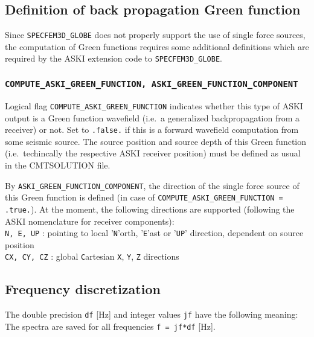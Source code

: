 \documentclass[12pt,a4paper]{article}
\newcommand{\lcode}[1]{\nolinkurl{#1}}
\newcommand{\ASKI}{ {\ttfamily ASKI} }
\begin{document}
\subsection{Definition of back propagation Green function}
Since \lcode{SPECFEM3D_GLOBE} does not properly support the use of single force sources,
the computation of Green functions requires some additional definitions which
are required by the \ASKI{} extension code to \lcode{SPECFEM3D_GLOBE}.

\subsubsection*{\lcode{COMPUTE_ASKI_GREEN_FUNCTION, ASKI_GREEN_FUNCTION_COMPONENT}}
Logical flag \lcode{COMPUTE_ASKI_GREEN_FUNCTION} indicates whether this type of \ASKI{} output is a Green 
function wavefield (i.e.\ a generalized backpropagation from a receiver) or not. Set to \lcode{.false.} if this 
is a forward wavefield computation from some seismic source.
The source position and source depth of this Green function (i.e.\ techincally the respective \ASKI{} receiver 
position) must be defined as usual in the CMTSOLUTION file.

By \lcode{ASKI_GREEN_FUNCTION_COMPONENT}, the direction of the single force source of this Green function is 
defined (in case of \lcode{COMPUTE_ASKI_GREEN_FUNCTION = .true.}).
At the moment, the following directions are supported (following the \ASKI{} nomenclature for receiver components):\\
\lcode{N, E, UP} : pointing to local '\lcode{N}'orth, '\lcode{E}'ast or '\lcode{UP}' direction, dependent on 
source position\\
\lcode{CX, CY, CZ} : global \lcode{C}artesian \lcode{X}, \lcode{Y}, \lcode{Z} directions

\subsection{Frequency discretization}
The double precision \lcode{df} [Hz] and integer values \lcode{jf} have the following meaning:
The spectra are saved for all frequencies \lcode{f = jf*df} [Hz].
\end{document}
